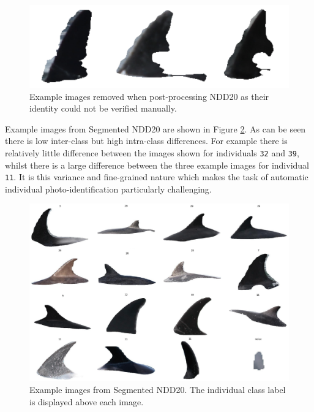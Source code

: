 \begin{figure}[b]
	\begin{center}
		\includegraphics[scale=0.5]{Chapter5/figs/removed-segmentations.png}
	\end{center}
	\caption[Example images removed when post-processing NDD20 as their identity could not be verified manually.]{Example images removed when post-processing NDD20 as their identity could not be verified manually.}
	\label{fig:removed-examples}
\end{figure}

Example images from Segmented NDD20 are shown in Figure \ref{fig:segmented-ndd20-example}. As can be seen there is low inter-class but high intra-class differences. For example there is relatively little difference between the images shown for individuals \texttt{32} and \texttt{39}, whilst there is a large difference between the three example images for individual \texttt{11}. It is this variance and fine-grained nature which makes the task of automatic individual photo-identification particularly challenging. 

\begin{figure}
	\begin{center}
		\includegraphics[scale=0.6]{Chapter5/figs/segmented-ndd20-tiled-updated.png}
	\end{center}
	\caption[Example images from Segmented NDD20.]{Example images from Segmented NDD20. The individual class label is displayed above each image.}
	\label{fig:segmented-ndd20-example}
\end{figure}

